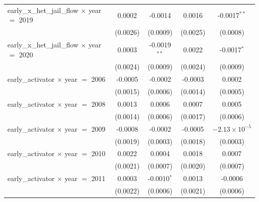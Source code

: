 \begin{tabular}{lcccc}
   early\_x\_het\_jail\_flow $\times$ year $=$ 2019      & 0.0002                 & -0.0014                   & 0.0016                 & -0.0017$^{**}$\\   
                                                         & (0.0026)               & (0.0009)                  & (0.0025)               & (0.0008)\\   
   early\_x\_het\_jail\_flow $\times$ year $=$ 2020      & 0.0003                 & -0.0019$^{**}$            & 0.0022                 & -0.0017$^{*}$\\   
                                                         & (0.0024)               & (0.0009)                  & (0.0024)               & (0.0009)\\   
   early\_activator $\times$ year $=$ 2006               & -0.0005                & -0.0002                   & -0.0003                & 0.0002\\   
                                                         & (0.0015)               & (0.0006)                  & (0.0014)               & (0.0005)\\   
   early\_activator $\times$ year $=$ 2008               & 0.0013                 & 0.0006                    & 0.0007                 & 0.0005\\   
                                                         & (0.0014)               & (0.0006)                  & (0.0017)               & (0.0006)\\   
   early\_activator $\times$ year $=$ 2009               & -0.0008                & -0.0002                   & -0.0005                & $-2.13\times 10^{-5}$\\    
                                                         & (0.0019)               & (0.0003)                  & (0.0018)               & (0.0003)\\   
   early\_activator $\times$ year $=$ 2010               & 0.0022                 & 0.0004                    & 0.0018                 & 0.0007\\   
                                                         & (0.0021)               & (0.0007)                  & (0.0020)               & (0.0007)\\   
   early\_activator $\times$ year $=$ 2011               & 0.0003                 & -0.0010$^{*}$             & 0.0013                 & -0.0006\\   
                                                         & (0.0022)               & (0.0006)                  & (0.0021)               & (0.0006)\\   

\end{tabular}
